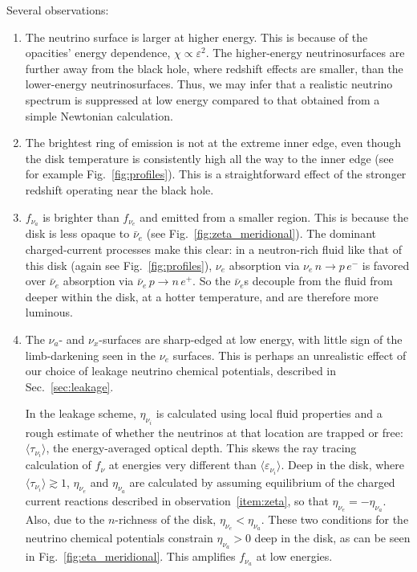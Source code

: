 Several observations:
\begin{enumerate}
  \item The neutrino surface is larger at higher energy.
    This is because of the opacities' energy dependence,
    $\chi\propto\varepsilon^2$. The higher-energy neutrinosurfaces are further
    away from the black hole, where redshift effects are smaller, than the
    lower-energy neutrinosurfaces. Thus, we may infer that a realistic neutrino
    spectrum is suppressed at low energy compared to that obtained from a
    simple Newtonian calculation.
  \item The brightest ring of emission is not at the extreme inner edge, even
    though the disk temperature is consistently high all the way to the inner
    edge (see for example Fig.~\ref{fig:profiles}). This is a straightforward
    effect of the stronger redshift operating near the black hole.
  \item $f_{\nu_a}$ is brighter than $f_{\nu_e}$
    and emitted from a smaller region.
    \label{item:zeta}
    This is because the disk is less opaque
    to $\bar{\nu}_e$ (see Fig.~\ref{fig:zeta_meridional}). The dominant
    charged-current processes make this clear: in a neutron-rich fluid like that
    of this disk (again see Fig.~\ref{fig:profiles}), $\nu_e$ absorption via
    $\nu_e\,n \rightarrow p\,e^{-}$
    is favored over $\bar{\nu}_e$ absorption via
    $\bar{\nu}_e\,p \rightarrow n\,e^{+}$.
    So the $\bar{\nu}_e$s decouple from the fluid from deeper within the disk,
    at a hotter temperature, and are therefore more luminous.
  \item The $\nu_a$- and $\nu_x$-surfaces are sharp-edged at low energy,
    with little sign of the limb-darkening seen in the $\nu_e$ surfaces.
    \label{item:eta}
    This is perhaps an unrealistic effect of our choice of leakage neutrino
    chemical potentials, described in Sec.~\ref{sec:leakage}.

    In the leakage scheme, $\eta_{\nu_i}$ is calculated using local fluid
    properties and a rough estimate of whether the neutrinos at that location are
    trapped or free: $\langle \tau_{\nu_i} \rangle$, the energy-averaged optical
    depth.
    This skews the ray tracing calculation of $f_\nu$ at energies very different
    than $\langle \varepsilon_{\nu_i} \rangle$.
    Deep in the disk, where $\langle \tau_{\nu_i} \rangle \gtrsim 1$,
    $\eta_{\nu_e}$ and $\eta_{\nu_a}$ are calculated by assuming equilibrium
    of the charged current reactions described in observation~\ref{item:zeta},
    so that $\eta_{\nu_e}=-\eta_{\nu_a}$.
    Also, due to the $n$-richness of the disk, $\eta_{\nu_e}<\eta_{\nu_a}$.
    These two conditions for the neutrino chemical potentials constrain
    $\eta_{\nu_a}>0$ deep in the disk, as can be seen in
    Fig.~\ref{fig:eta_meridional}.
    This amplifies $f_{\nu_a}$ at low energies.


\end{enumerate}
